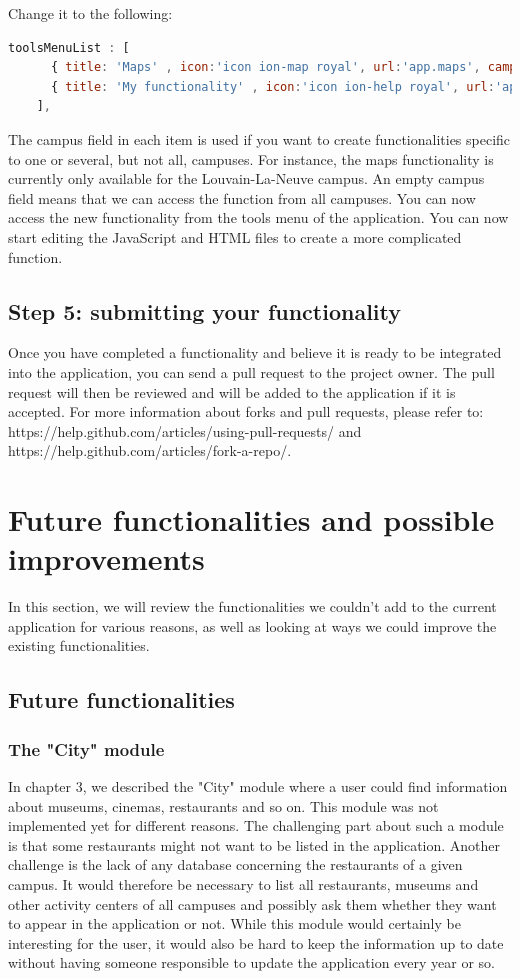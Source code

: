 \documentclass[11pt, a4paper]{report}
\begin{document}
Change it to the following:
\begin{lstlisting}[language=JavaScript]
   toolsMenuList : [
      { title: 'Maps' , icon:'icon ion-map royal', url:'app.maps', campus:['Louvain-la-Neuve']},
      { title: 'My functionality' , icon:'icon ion-help royal', url:'app.myfunctionality', campus:[]}
    ],
\end{lstlisting}
The campus field in each item is used if you want to create functionalities specific to one or several, but not all, campuses. For instance, the maps functionality is currently only available for the Louvain-La-Neuve campus. An empty campus field means that we can access the function from all campuses.
You can now access the new functionality from the tools menu of the application. You can now start editing the JavaScript and HTML files to create a more complicated function.
\subsection{Step 5: submitting your functionality}
Once you have completed a functionality and believe it is ready to be integrated into the application, you can send a pull request to the project owner. The pull request will then be reviewed and will be added to the application if it is accepted. For more information about forks and pull requests, please refer to: https://help.github.com/articles/using-pull-requests/ and https://help.github.com/articles/fork-a-repo/.
\section{Future functionalities and possible improvements}
In this section, we will review the functionalities we couldn't add to the current application for various reasons, as well as looking at ways we could improve the existing functionalities.
\subsection{Future functionalities}
\subsubsection{The "City" module}
In chapter 3, we described the "City" module where a user could find information about museums, cinemas, restaurants and so on. This module was not implemented yet for different reasons. The challenging part about such a module is that some restaurants might not want to be listed in the application. Another challenge is the lack of any database concerning the restaurants of a given campus. It would therefore be necessary to list all restaurants, museums and other activity centers of all campuses and possibly ask them whether they want to appear in the application or not.
While this module would certainly be interesting for the user, it would also be hard to keep the information up to date without having someone responsible to update the application every year or so.
\end{document}
